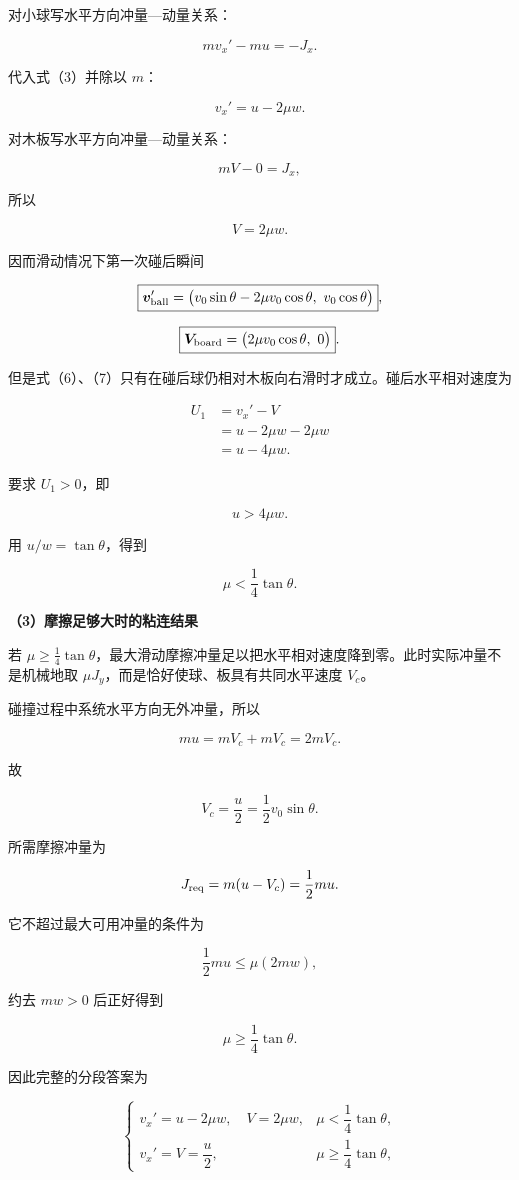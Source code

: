 \documentclass[12pt,a4paper,UTF8]{ctexart}
\begin{document}
对小球写水平方向冲量---动量关系：

\[mv_x'-mu=-J_x.\]

代入式（3）并除以 \(m\)：

\[v_x'=u-2\mu w.\]

对木板写水平方向冲量---动量关系：

\[mV-0=J_x,\]

所以

\[V=2\mu w.\]

因而滑动情况下第一次碰后瞬间

\[\boxed{\bm v'_{\rm ball}=\bigl(v_0\sin\theta-2\mu v_0\cos\theta,\ v_0\cos\theta\bigr)},\]

\[\boxed{\bm V_{\rm board}=\bigl(2\mu v_0\cos\theta,\ 0\bigr)}.\]

但是式（6）、（7）只有在碰后球仍相对木板向右滑时才成立。碰后水平相对速度为

\[\begin{aligned}
U_1&=v_x'-V\\
&=u-2\mu w-2\mu w\\
&=u-4\mu w.
\end{aligned}\]

要求 \(U_1>0\)，即

\[u>4\mu w.\]

用 \(u/w=\tan\theta\)，得到

\[\mu<\frac14\tan\theta.\]

\textbf{（3）摩擦足够大时的粘连结果}

若
\(\mu\geq\tfrac14\tan\theta\)，最大滑动摩擦冲量足以把水平相对速度降到零。此时实际冲量不是机械地取
\(\mu J_y\)，而是恰好使球、板具有共同水平速度 \(V_c\)。

碰撞过程中系统水平方向无外冲量，所以

\[mu=mV_c+mV_c=2mV_c.\]

故

\[V_c=\frac u2=\frac12v_0\sin\theta.\]

所需摩擦冲量为

\[J_{\rm req}=m(u-V_c)=\frac12mu.\]

它不超过最大可用冲量的条件为

\[\frac12mu\leq\mu(2mw),\]

约去 \(mw>0\) 后正好得到

\[\mu\geq\frac14\tan\theta.\]

因此完整的分段答案为

\[\boxed{
\begin{cases}
v_x'=u-2\mu w,\quad V=2\mu w,&\mu<\dfrac14\tan\theta,\\[6pt]
v_x'=V=\dfrac u2,&\mu\geq\dfrac14\tan\theta,
\end{cases}}
\]
\end{document}
